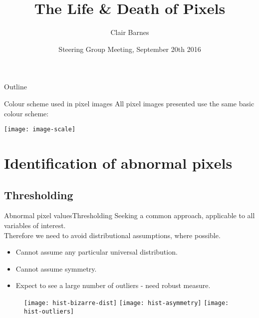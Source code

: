 \documentclass[8pt]{beamer}
\title{The Life \& Death of Pixels}
\author{Clair Barnes}
\institute[University of Warwick] %
{
  Department of Statistics \& WMG\\
  University of Warwick
}
\date{Steering Group Meeting, September 20th 2016}
\begin{document}
\begin{frame}
  \titlepage
\end{frame}

\begin{frame}{Outline}

  \tableofcontents
\end{frame}


\begin{frame}{Colour scheme used in pixel images}
	All pixel images presented use the same basic colour scheme:
	
	\begin{center}
	\texttt{[image: image-scale]}
	\end{center}

\end{frame}

\section{Identification of abnormal pixels}

\subsection{Thresholding}

\begin{frame}{Abnormal pixel values}{Thresholding}
Seeking a common approach, applicable to all variables of interest. \\
Therefore we need to avoid distributional assumptions, where possible.
	\begin{itemize}
		\item Cannot assume any particular universal distribution.				%
		\item Cannot assume symmetry.
		\item Expect to see a large number of outliers - need robust measure.		%
	\end{itemize}
	
	\begin{figure}[!ht]
		\texttt{[image: hist-bizarre-dist]}
		\texttt{[image: hist-asymmetry]}
		\texttt{[image: hist-outliers]}
	\end{figure}
\end{frame}
\end{document}
